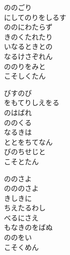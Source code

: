 \documentclass[10pt,b5j]{tarticle} %
\begin{document}
\vspace{1.5em} %
\newcommand{\linespace}{0.5em} %
\newcommand{\blocksize}{0.5\hsize} %
\begin{enumerate} %
    \begin{minipage}[c]{\blocksize}
    
        \vspace{\linespace}
        \item
        ののごり\\
        にしてのりをしるす\\
        ののにわたらず\\
        きのくたれたり\\
        いなるときとの\\
        なるけさぞれん\\
        ののりをみと\\
        こそしくたん
        
        \vspace{\linespace}
        \item
        びすのび\\
        をもてりしえをる\\
        のはばれ\\
        ののくる\\
        なるきは\\
        ととをちてなん\\
        びのちせじと\\
        こそとたん
        
        \vspace{\linespace}
        \item
        ののさよ\\
        のののさよ\\
        きしきに\\
        ちえたるわし\\
        べるにさえ\\
        もなきのをばぬ\\
        ののをい\\
        こそくめん
    

\end{minipage}
\end{enumerate}
\end{document}
